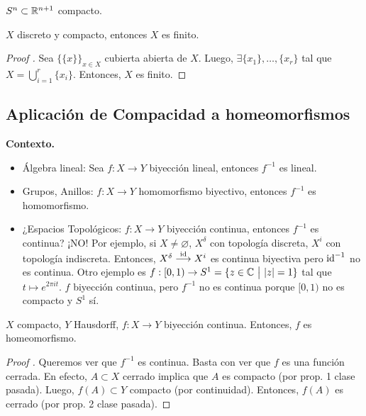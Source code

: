 
\begin{eg}
	$S^n \subset \mathbb{R}^{n+1}$ compacto.
\end{eg}

\begin{eg}
	$X$ discreto y compacto, entonces $X$ es finito.
\end{eg}
\begin{proof}[Proof ]
	Sea $\{\{x\}\}_{x \in X}$ cubierta abierta de $X$. Luego, $\exists \{x_{1}\},\dots,\{x_{r}\}$ tal que $X = \bigcup_{i=1}^{r} \{x_{i}\}$. Entonces, $X$ es finito.
\end{proof}

\subsection*{Aplicación de Compacidad a homeomorfismos}

\textbf{Contexto.}
\begin{itemize}
	\item Álgebra lineal: Sea $f : X \to Y$ biyección lineal, entonces $f^{-1}$ es lineal.

	\item Grupos, Anillos: $f : X \to Y$ homomorfismo biyectivo, entonces $f^{-1}$ es homomorfismo.

	\item ¿Espacios Topológicos: $f : X \to Y$ biyección continua, entonces $f^{-1}$ es continua? ¡NO! Por ejemplo, si $X \neq \varnothing$,  $X^{\delta}$ con topología discreta, $X^{i}$ con topología indiscreta. Entonces, $X^{\delta} \stackrel{\operatorname{id}}{\longrightarrow} X^{i}$ es continua biyectiva pero $\operatorname{id}^{-1}$ no es continua. Otro ejemplo es $f : [0,1) \to S^{1} = \{z \in \C \ \big| \ |z| = 1\}$ tal que $t \mapsto e^{2 \pi i t}$. $f$ biyección continua, pero $f^{-1}$ no es continua porque $[0,1)$ no es compacto y $S^{1}$ sí.
\end{itemize}

\begin{theorem}
	$X$ compacto, $Y$ Hausdorff, $f : X \to Y$ biyección continua. Entonces, $f$ es homeomorfismo.
\end{theorem}
\begin{proof}[Proof ]
	Queremos ver que $f^{-1}$ es continua. Basta con ver que $f$ es una función cerrada. En efecto, $A \subset X$ cerrado implica que $A$ es compacto (por prop. 1 clase pasada). Luego, $f(A) \subset Y$ compacto (por continuidad). Entonces, $f(A)$ es cerrado (por prop. 2 clase pasada).
\end{proof}

